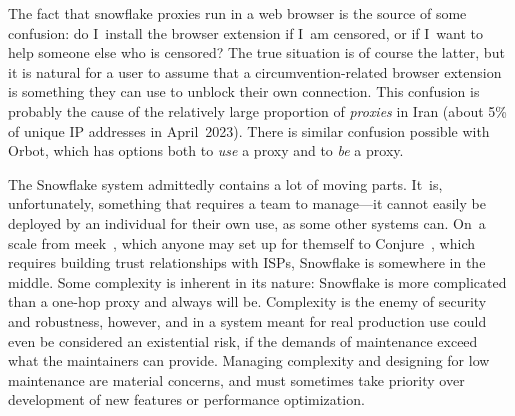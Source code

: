 \documentclass[letterpaper,twocolumn]{article}
\begin{document}
The fact that snowflake proxies run in a web browser
is the source of some confusion:
do I~install the browser extension if I~am censored,
or if I~want to help someone else who is censored?
The true situation is of course the latter,
but it is natural for a user to assume
that a circumvention-related browser extension is something
they can use to unblock their own connection.
This confusion is probably the cause of
the relatively large proportion of \emph{proxies} in Iran
(about 5\% of unique IP addresses in April~2023).
There is similar confusion possible with Orbot,
which has options both
to \emph{use} a proxy and to \emph{be} a proxy.

The Snowflake system
admittedly contains a lot of moving parts.
It~is, unfortunately,
something that requires a team to manage---it
cannot easily be deployed by an individual for their own use,
as some other systems can.
On~a scale from meek~\cite{Fifield2015a}, which anyone may set up for themself
to Conjure~\cite{Frolov2019b}, which requires building trust relationships with ISPs,
Snowflake is somewhere in the middle.
Some complexity is inherent in its nature:
Snowflake is more complicated than a one-hop proxy
and always will be.
Complexity is the enemy of security and robustness, however,
and in a system meant for real production use
could even be considered an existential risk,
if the demands of maintenance exceed what the maintainers can provide.
Managing complexity and designing for low maintenance
are material concerns,
and must sometimes take priority over
development of new features or performance optimization.

\end{document}
